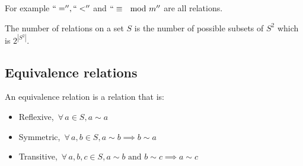 \documentclass{article}
\newcommand{\A}{\,\forall\,}
\newcounter{example}[section]
\begin{document}
For example \(``='', ``<''\) and \(``\equiv\mod m''\) are all relations.

The number of relations on a set \(S\) is the number of possible subsets of \(S^2\) which is \(2^{|S^2|}\).

\subsection*{Equivalence relations}

An equivalence relation is a relation that is:
\begin{itemize}
\item Reflexive, \(\A a\in S, a\sim a\)
\item Symmetric, \(\A a,b\in S, a\sim b\implies b\sim a\)
\item Transitive, \(\A a,b,c\in S, a\sim b\text{ and }b\sim c\implies a\sim c\)
\end{itemize}
\end{document}
